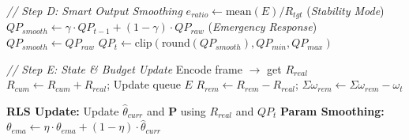 \begin{algorithm}[t]
\begin{algorithmic}[0]
        \vspace{0.3em}
        \State \textit{// Step D: Smart Output Smoothing}
        \State $e_{ratio} \leftarrow \text{mean}(E) / R_{tgt}$
         \quad (\textit{Stability Mode})
            \State $QP_{smooth} \leftarrow \gamma \cdot QP_{t-1} + (1 - \gamma) \cdot QP_{raw}$
        \Else \quad (\textit{Emergency Response})
            \State $QP_{smooth} \leftarrow QP_{raw}$
        \EndIf
        \State $QP_t \leftarrow \text{clip}(\text{round}(QP_{smooth}), QP_{min}, QP_{max})$

        \vspace{0.5em}
        \State \textit{// Step E: State \& Budget Update}
        \State Encode frame $\to$ get $R_{real}$
        \State $R_{cum} \leftarrow R_{cum} + R_{real}$; \quad Update queue $E$
        \State $R_{rem} \leftarrow R_{rem} - R_{real}$; \quad $\Sigma\omega_{rem} \leftarrow \Sigma\omega_{rem} - \omega_t$

        \vspace{0.3em}
        \State \textbf{RLS Update:} Update $\hat{\theta}_{curr}$ and $\mathbf{P}$ using $R_{real}$ and $QP_t$
        \State \textbf{Param Smoothing:} $\theta_{ema} \leftarrow \eta \cdot \theta_{ema} + (1 - \eta) \cdot \hat{\theta}_{curr}$

    \EndFor
\end{algorithmic}
\end{algorithm}